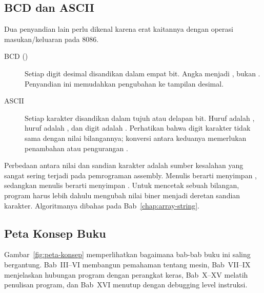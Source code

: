 \subsection{BCD dan ASCII}

Dua penyandian lain perlu dikenal karena erat kaitannya dengan
operasi masukan/keluaran pada 8086.

\begin{description}
    \item[BCD ()] Setiap digit desimal
          disandikan dalam empat bit. Angka  menjadi
          , bukan . Penyandian ini
          memudahkan pengubahan ke tampilan desimal.

    \item[ASCII] Setiap karakter disandikan dalam tujuh atau delapan
          bit. Huruf  adalah , huruf  adalah
          , dan digit  adalah . Perhatikan
          bahwa digit karakter tidak sama dengan nilai bilangannya;
          konversi antara keduanya memerlukan penambahan atau
          pengurangan .
\end{description}

\begin{infobox}
Perbedaan antara nilai dan sandian karakter adalah sumber kesalahan
yang sangat sering terjadi pada pemrograman assembly. Menulis
 berarti menyimpan , sedangkan menulis 
berarti menyimpan . Untuk mencetak sebuah bilangan,
program harus lebih dahulu mengubah nilai biner menjadi deretan
sandian karakter. Algoritmanya dibahas pada
Bab~\ref{chap:array-string}.
\end{infobox}

\subsection{Peta Konsep Buku}

Gambar~\ref{fig:peta-konsep} memperlihatkan bagaimana bab-bab buku
ini saling bergantung. Bab~III--VI membangun pemahaman tentang
mesin, Bab~VII--IX menjelaskan hubungan program dengan perangkat
keras, Bab~X--XV melatih penulisan program, dan Bab~XVI menutup
dengan debugging level instruksi.

